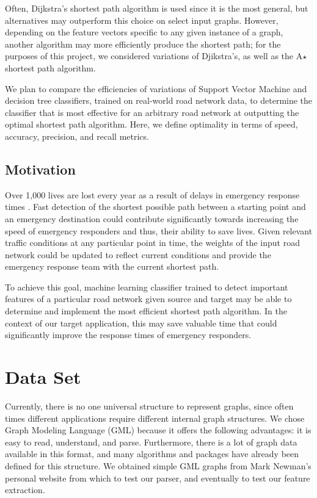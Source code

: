 \documentclass{article}
\begin{document}
Often, Dijkstra's shortest path algorithm is used since it is the most general, but alternatives may outperform this choice on select input graphs. However, depending on the feature vectors specific to any given instance of a graph, another algorithm may more efficiently produce the shortest path; for the purposes of this project, we considered variations of Djikstra's, as well as the A$\star$ shortest path algorithm.

We plan to compare the efficiencies of variations of Support Vector Machine and decision tree classifiers, trained on real-world road network data, to determine the classifier that is most effective for an arbitrary road network at outputting the optimal shortest path algorithm. Here, we define optimality in terms of speed, accuracy, precision, and recall metrics.

\subsection{Motivation}
Over 1,000 lives are lost every year as a result of delays in emergency response times . Fast detection of the shortest possible path between a starting point and an emergency destination could contribute significantly towards increasing the speed of emergency responders and thus, their ability to save lives. Given relevant traffic conditions at any particular point in time, the weights of the input road network could be updated to reflect current conditions and provide the emergency response team with the current shortest path.

To achieve this goal, machine learning classifier trained to detect important features of a particular road network given source and target may be able to determine and implement the most efficient shortest path algorithm. In the context of our target application, this may save valuable time that could significantly improve the response times of emergency responders.

\section{Data Set}

Currently, there is no one universal structure to represent graphs, since often times different applications require different internal graph structures. We chose Graph Modeling Language (GML) because it offers the following advantages: it is easy to read, understand, and parse\cite{Himsolt}. Furthermore, there is a lot of graph data available in this format, and many algorithms and packages have already been defined for this structure. We obtained simple GML graphs from Mark Newman's personal website from which to test our parser, and eventually to test our feature extraction\cite{Newman13}.
\end{document}
